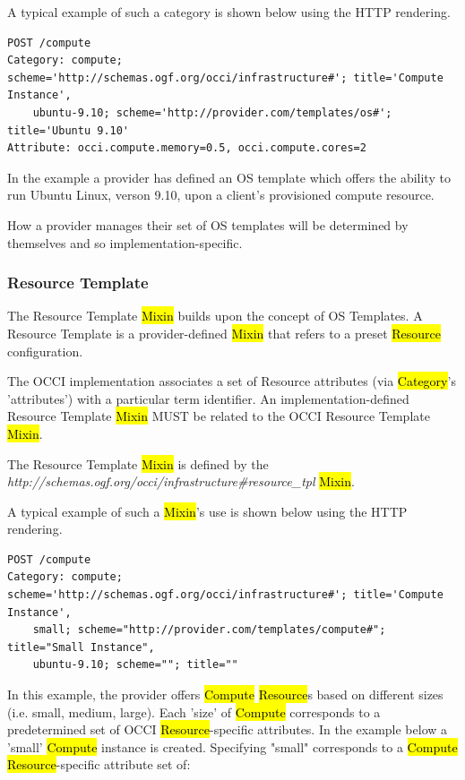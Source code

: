 \documentclass[10pt,a4paper]{article}
\begin{document}
A typical example of such a category is shown below using the HTTP rendering. 

\begin{verbatim}
POST /compute
Category: compute; scheme='http://schemas.ogf.org/occi/infrastructure#'; title='Compute Instance', 
    ubuntu-9.10; scheme='http://provider.com/templates/os#'; title='Ubuntu 9.10'
Attribute: occi.compute.memory=0.5, occi.compute.cores=2
\end{verbatim}
In the example a provider has defined an OS template which offers the ability to run Ubuntu Linux,
verson 9.10, upon a client's provisioned compute resource.

How a provider manages their set of OS templates will be determined by themselves and so 
implementation-specific.

\subsubsection{Resource Template}
The Resource Template \hl{Mixin} builds upon the concept of OS Templates. A Resource Template is
a provider-defined \hl{Mixin} that refers to a preset \hl{Resource} configuration. 

The OCCI implementation associates a set of Resource attributes (via \hl{Category}'s 'attributes') with 
a particular term identifier. An implementation-defined Resource Template \hl{Mixin} MUST be related 
to the OCCI Resource Template \hl{Mixin}. 

The Resource Template \hl{Mixin} is defined by the 
\textit{http://schemas.ogf.org/occi/infrastructure\#resource\_tpl} \hl{Mixin}.

A typical example of such a \hl{Mixin}'s use is shown below using the HTTP rendering. 

\begin{verbatim}
POST /compute
Category: compute; scheme='http://schemas.ogf.org/occi/infrastructure#'; title='Compute Instance', 
    small; scheme="http://provider.com/templates/compute#"; title="Small Instance", 
    ubuntu-9.10; scheme=""; title=""
\end{verbatim}

In this example, the provider offers \hl{Compute} \hl{Resource}s based on different sizes (i.e. small,
medium, large). Each 'size' of \hl{Compute} corresponds to a predetermined set of OCCI 
\hl{Resource}-specific attributes. In the example below a 'small' \hl{Compute} instance is created. 
Specifying "small" corresponds to a \hl{Compute} \hl{Resource}-specific attribute set of:
\end{document}
